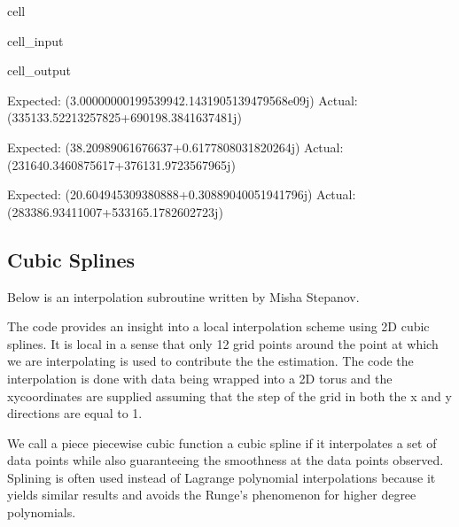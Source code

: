 \documentclass[letterpaper,10pt,english]{jupyterBook}
\begin{document}
\begin{sphinxuseclass}{cell}
\begin{sphinxVerbatimInput}
\begin{sphinxuseclass}{cell_input}
\end{sphinxuseclass}\end{sphinxVerbatimInput}
\begin{sphinxVerbatimOutput}

\begin{sphinxuseclass}{cell_output}
\begin{sphinxVerbatim}[commandchars=\\\{\}]
Expected: (3.0000000019953994\PYGZhy{}2.1431905139479568e\PYGZhy{}09j) 
Actual: (\PYGZhy{}335133.52213257825+690198.3841637481j)

Expected: (38.20989061676637+0.6177808031820264j) 
Actual: (\PYGZhy{}231640.3460875617+376131.9723567965j)

Expected:  (20.604945309380888+0.30889040051941796j) 
Actual: (\PYGZhy{}283386.93411007+533165.1782602723j)
\end{sphinxVerbatim}

\end{sphinxuseclass}\end{sphinxVerbatimOutput}

\end{sphinxuseclass}

\subsection{Cubic Splines}
\label{\detokenize{interpolation:cubic-splines}}
\sphinxAtStartPar
Below is an interpolation subroutine written by Misha Stepanov.

\sphinxAtStartPar
The code provides an insight into a local interpolation scheme using 2D cubic splines. It is local in a sense that only 12 grid points around the point at which we are interpolating is used to contribute the the estimation. The code the interpolation is done with data being wrapped into a 2D torus and the xy\sphinxhyphen{}coordinates are supplied assuming that the step of the grid in both the x and y directions are equal to 1.

\sphinxAtStartPar
We call a piece piecewise cubic function a cubic spline if it interpolates a set of data points while also guaranteeing the smoothness at the data points observed. Splining is often used instead of Lagrange polynomial interpolations because it yields similar results and avoids the Runge’s phenomenon for higher degree polynomials.
\end{document}
